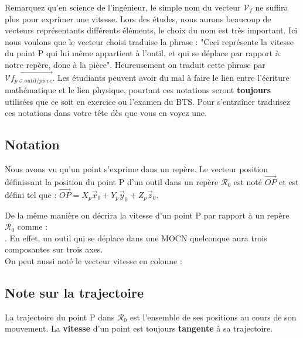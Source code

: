 \documentclass[
	11pt, %
	fleqn, %
	a4paper, %
]{LegrandOrangeBook}
\begin{document}
Remarquez qu'en science de l'ingénieur, le simple nom du vecteur $\mathcal{V}_f$ ne suffira plus pour exprimer une vitesse. Lors des études, nous aurons beaucoup de vecteurs représentants différents éléments, le choix du nom est très important. Ici nous voulons que le vecteur choisi traduise la phrase : "Ceci représente la vitesse du point P qui lui même appartient à l'outil, et qui se déplace par rapport à notre repère, donc à la pièce". Heureusement on traduit cette phrase par $\overrightarrow{\mathcal{V}f_{p \in outil / piece}}$. Les étudiants peuvent avoir du mal à faire le lien entre l'écriture mathématique et le lien physique, pourtant ces notations seront \textbf{toujours} utilisées que ce soit en exercice ou l'examen du BTS. Pour s'entraîner traduisez ces notations dans votre tête dès que vous en voyez une.

\subsection{Notation}

Nous avons vu qu'un point s'exprime dans un repère. Le vecteur position définissant la position du point P d'un outil dans un repère $\mathcal{R}_0$ est noté $\overrightarrow{OP}$ et est défini tel que : $\overrightarrow{OP} = X_p \vec{x}_0 + Y_p \vec{y}_0 + Z_p \vec{z}_0$.

De la même manière on décrira la vitesse d'un point P par rapport à un repère $\mathcal{R}_0$ comme : \\

 . En effet, un outil qui se déplace dans une MOCN quelconque aura trois composantes sur trois axes. \\

On peut aussi noté le vecteur vitesse en colonne :


\subsection*{Note sur la trajectoire}
La trajectoire du point P dans $\mathcal{R}_0$ est l’ensemble de ses positions au cours de son mouvement. La
\textbf{vitesse} d’un point est toujours \textbf{tangente} à sa trajectoire.
\end{document}
